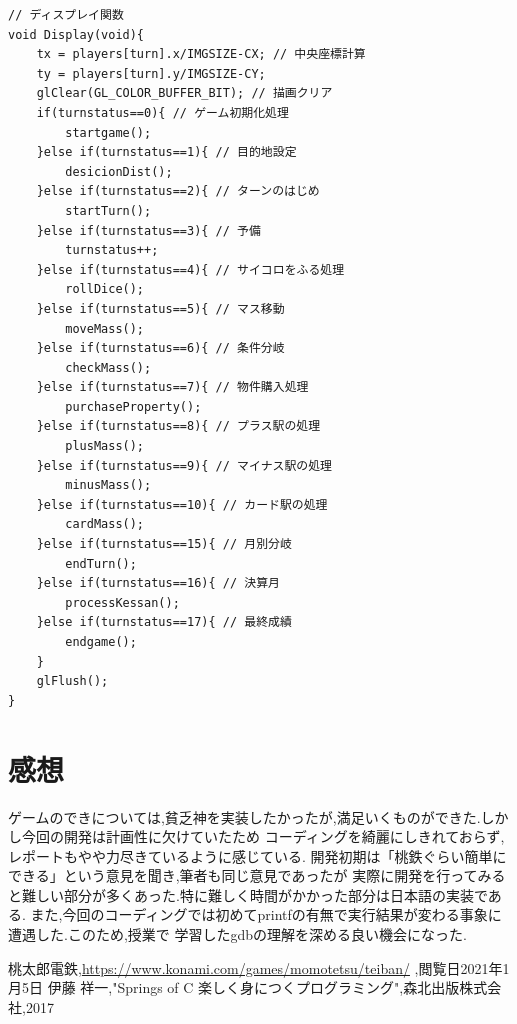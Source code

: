\documentclass[a4j]{jarticle}
\begin{document}
\begin{lstlisting}[basicstyle=\ttfamily\footnotesize, frame=single,label=code2,caption=game.c]
// ディスプレイ関数
void Display(void){
    tx = players[turn].x/IMGSIZE-CX; // 中央座標計算
    ty = players[turn].y/IMGSIZE-CY;
    glClear(GL_COLOR_BUFFER_BIT); // 描画クリア
    if(turnstatus==0){ // ゲーム初期化処理
        startgame();
    }else if(turnstatus==1){ // 目的地設定
        desicionDist();
    }else if(turnstatus==2){ // ターンのはじめ
        startTurn();
    }else if(turnstatus==3){ // 予備
        turnstatus++;
    }else if(turnstatus==4){ // サイコロをふる処理
        rollDice();
    }else if(turnstatus==5){ // マス移動
        moveMass();
    }else if(turnstatus==6){ // 条件分岐
        checkMass();
    }else if(turnstatus==7){ // 物件購入処理
        purchaseProperty();
    }else if(turnstatus==8){ // プラス駅の処理
        plusMass();
    }else if(turnstatus==9){ // マイナス駅の処理
        minusMass();
    }else if(turnstatus==10){ // カード駅の処理
        cardMass();
    }else if(turnstatus==15){ // 月別分岐
        endTurn();
    }else if(turnstatus==16){ // 決算月
        processKessan();
    }else if(turnstatus==17){ // 最終成績
        endgame();
    }
    glFlush();
}
    \end{lstlisting}


    \section{感想}
    ゲームのできについては,貧乏神を実装したかったが,満足いくものができた.しかし今回の開発は計画性に欠けていたため
    コーディングを綺麗にしきれておらず,レポートもやや力尽きているように感じている.
    開発初期は「桃鉄ぐらい簡単にできる」という意見を聞き,筆者も同じ意見であったが
    実際に開発を行ってみると難しい部分が多くあった.特に難しく時間がかかった部分は日本語の実装である.
    また,今回のコーディングでは初めてprintfの有無で実行結果が変わる事象に遭遇した.このため,授業で
    学習したgdbの理解を深める良い機会になった.
    

    \begin{thebibliography}{9}
          桃太郎電鉄,\url{https://www.konami.com/games/momotetsu/teiban/} ,閲覧日2021年1月5日
         伊藤 祥一,"Springs of C 楽しく身につくプログラミング",森北出版株式会社,2017
        \end{thebibliography}
\end{document}
